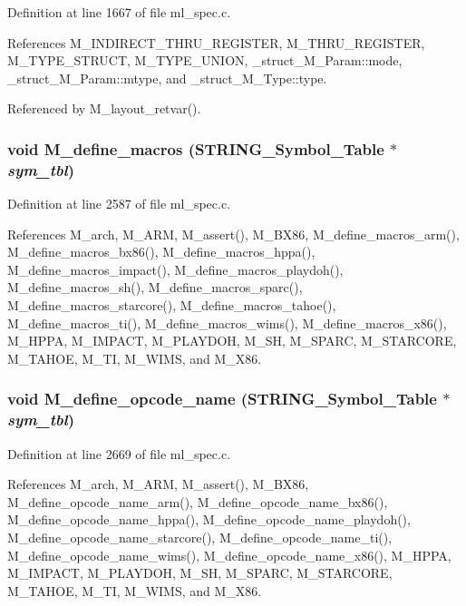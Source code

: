 Definition at line 1667 of file ml\_\-spec.c.

References M\_\-INDIRECT\_\-THRU\_\-REGISTER, M\_\-THRU\_\-REGISTER, M\_\-TYPE\_\-STRUCT, M\_\-TYPE\_\-UNION, \_\-struct\_\-M\_\-Param::mode, \_\-struct\_\-M\_\-Param::mtype, and \_\-struct\_\-M\_\-Type::type.

Referenced by M\_\-layout\_\-retvar().
\subsubsection{\setlength{\rightskip}{0pt plus 5cm}void M\_\-define\_\-macros (\bf{STRING\_\-Symbol\_\-Table} $\ast$ {\em sym\_\-tbl})}\label{ml__spec_8c_8af52b7802fdefa7d7e8bb29484b11dd}




Definition at line 2587 of file ml\_\-spec.c.

References M\_\-arch, M\_\-ARM, M\_\-assert(), M\_\-BX86, M\_\-define\_\-macros\_\-arm(), M\_\-define\_\-macros\_\-bx86(), M\_\-define\_\-macros\_\-hppa(), M\_\-define\_\-macros\_\-impact(), M\_\-define\_\-macros\_\-playdoh(), M\_\-define\_\-macros\_\-sh(), M\_\-define\_\-macros\_\-sparc(), M\_\-define\_\-macros\_\-starcore(), M\_\-define\_\-macros\_\-tahoe(), M\_\-define\_\-macros\_\-ti(), M\_\-define\_\-macros\_\-wims(), M\_\-define\_\-macros\_\-x86(), M\_\-HPPA, M\_\-IMPACT, M\_\-PLAYDOH, M\_\-SH, M\_\-SPARC, M\_\-STARCORE, M\_\-TAHOE, M\_\-TI, M\_\-WIMS, and M\_\-X86.
\subsubsection{\setlength{\rightskip}{0pt plus 5cm}void M\_\-define\_\-opcode\_\-name (\bf{STRING\_\-Symbol\_\-Table} $\ast$ {\em sym\_\-tbl})}\label{ml__spec_8c_23298a53583bc0b4f66c637ecbf1f105}




Definition at line 2669 of file ml\_\-spec.c.

References M\_\-arch, M\_\-ARM, M\_\-assert(), M\_\-BX86, M\_\-define\_\-opcode\_\-name\_\-arm(), M\_\-define\_\-opcode\_\-name\_\-bx86(), M\_\-define\_\-opcode\_\-name\_\-hppa(), M\_\-define\_\-opcode\_\-name\_\-playdoh(), M\_\-define\_\-opcode\_\-name\_\-starcore(), M\_\-define\_\-opcode\_\-name\_\-ti(), M\_\-define\_\-opcode\_\-name\_\-wims(), M\_\-define\_\-opcode\_\-name\_\-x86(), M\_\-HPPA, M\_\-IMPACT, M\_\-PLAYDOH, M\_\-SH, M\_\-SPARC, M\_\-STARCORE, M\_\-TAHOE, M\_\-TI, M\_\-WIMS, and M\_\-X86.
